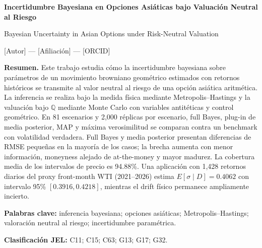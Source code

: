 \documentclass[12pt,letterpaper]{article}
\newif\ifblind
\begin{document}

\begin{center}
{\Large\bfseries Incertidumbre Bayesiana en Opciones Asiáticas bajo Valuación Neutral al Riesgo\par}
\vspace{0.3cm}
{\large Bayesian Uncertainty in Asian Options under Risk-Neutral Valuation\par}
\vspace{0.55cm}
\ifblind
{\normalsize Manuscrito anónimo para revisión por pares\par}
\else
{\normalsize [Autor] --- [Afiliación] --- [ORCID]\par}
\fi
\end{center}

\vspace{0.45cm}

\textbf{Resumen.} Este trabajo estudia cómo la incertidumbre bayesiana sobre parámetros de un movimiento browniano geométrico estimados con retornos históricos se transmite al valor neutral al riesgo de una opción asiática aritmética. La inferencia se realiza bajo la medida física mediante Metropolis--Hastings y la valuación bajo $\mathbb Q$ mediante Monte Carlo con variables antitéticas y control geométrico. En 81 escenarios y 2,000 réplicas por escenario, full Bayes, plug-in de media posterior, MAP y máxima verosimilitud se comparan contra un benchmark con volatilidad verdadera. Full Bayes y media posterior presentan diferencias de RMSE pequeñas en la mayoría de los casos; la brecha aumenta con menor información, moneyness alejado de at-the-money y mayor madurez. La cobertura media de los intervalos de precio es 94.88\%. Una aplicación con 1,428 retornos diarios del proxy front-month WTI (2021--2026) estima $E[\sigma\mid D]=0.4062$ con intervalo 95\% $[0.3916,0.4218]$, mientras el drift físico permanece ampliamente incierto.

\textbf{Palabras clave:} inferencia bayesiana; opciones asiáticas; Metropolis--Hastings; valoración neutral al riesgo; incertidumbre paramétrica.

\textbf{Clasificación JEL:} C11; C15; C63; G13; G17; G32.

\vspace{0.35cm}
\end{document}
